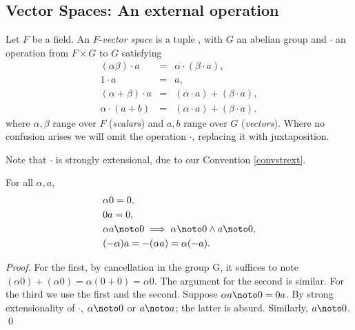 
\subsection{Vector Spaces: An external operation}

\begin{definition}
Let $F$ be a field.  An $F$-{\em vector space\/} is a 
tuple , with $G$ an abelian group and $\cdot$ 
an operation from $F\times G$ to $G$ satisfying
\begin{eqnarray*}
(\alpha\beta) \cdot a &=& \alpha\cdot(\beta\cdot a),\\
1\cdot a &=& a,\\
(\alpha+\beta)\cdot a &=& (\alpha\cdot a) + (\beta\cdot a),\\
\alpha\cdot(a+b) &=& (\alpha\cdot a) + (\beta\cdot a).
\end{eqnarray*}
where $\alpha,\beta$ range over $F$ (\emph{scalars}) and $a,b$ range
over $G$ (\emph{vectors}).
Where no confusion arises we will omit the operation $\cdot$,
replacing it with juxtaposition. 
\end{definition}
Note that $\cdot$ is strongly extensional, due to our Convention
\ref{convstrext}.

\begin{lemma} For all $\alpha,a$,
\begin{eqnarray*}
& \alpha 0 = 0,\\
& 0 a = 0,\\
& \alpha a \noto 0 \implies \alpha\noto 0 \wedge a\noto 0,\\
& (-\alpha)a =  -(\alpha a)  = \alpha(-a).
\end{eqnarray*}
\end{lemma}
\begin{proof}
For the first, by cancellation in the group G, it suffices to note
$(\alpha 0)+(\alpha 0)=\alpha (0+0)=\alpha 0$.
The argument for the second is similar. For the third we use the first
and the second. Suppose $\alpha a \noto 0=0 a$. By strong
extensionality of $\cdot$, $\alpha\noto 0$ or $a\noto a$; the latter is absurd.
Similarly, $a\noto 0$. \qed
\end{proof}

